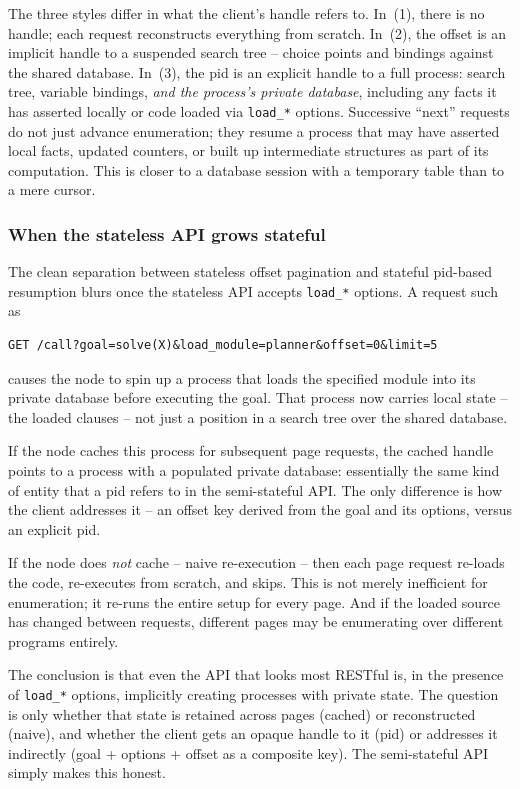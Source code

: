 The three styles differ in what the client's handle refers to.
In~(1), there is no handle; each request reconstructs everything
from scratch. In~(2), the offset is an implicit handle to a
suspended search tree -- choice points and bindings against the
shared database. In~(3), the pid is an explicit handle to a full
process: search tree, variable bindings, \emph{and the process's
private database}, including any facts it has asserted locally or
code loaded via \texttt{load\_*} options. Successive ``next''
requests do not just advance enumeration; they resume a process that
may have asserted local facts, updated counters, or built up
intermediate structures as part of its computation. This is closer to
a database session with a temporary table than to a mere cursor.


\subsubsection{When the stateless API grows stateful}

The clean separation between stateless offset pagination and stateful
pid-based resumption blurs once the stateless API accepts
\texttt{load\_*} options. A request such as
%
\begin{verbatim}
GET /call?goal=solve(X)&load_module=planner&offset=0&limit=5
\end{verbatim}
%
causes the node to spin up a process that loads the specified module
into its private database before executing the goal. That process now
carries local state -- the loaded clauses -- not just a position in a
search tree over the shared database.

If the node caches this process for subsequent page requests, the
cached handle points to a process with a populated private database:
essentially the same kind of entity that a pid refers to in the
semi-stateful API. The only difference is how the client addresses it
-- an offset key derived from the goal and its options, versus an
explicit pid.

If the node does \emph{not} cache -- naive re-execution -- then each
page request re-loads the code, re-executes from scratch, and skips.
This is not merely inefficient for enumeration; it re-runs the entire
setup for every page. And if the loaded source has changed between
requests, different pages may be enumerating over different programs
entirely.

The conclusion is that even the API that looks most RESTful is, in
the presence of \texttt{load\_*} options, implicitly creating
processes with private state. The question is only whether that state
is retained across pages (cached) or reconstructed (naive), and
whether the client gets an opaque handle to it (pid) or addresses it
indirectly (goal + options + offset as a composite key). The
semi-stateful API simply makes this honest.


